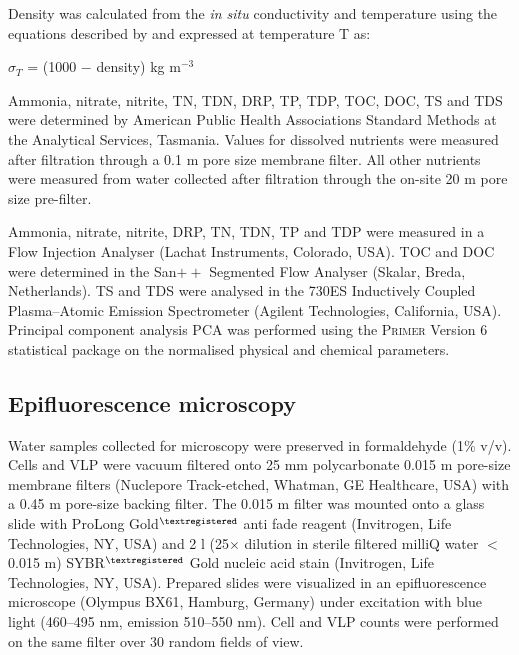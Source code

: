 Density was calculated from the \emph{in situ} conductivity and temperature using the equations described by \citet{Gibson1990} and expressed at temperature T as:

$\sigma_T$ = (1000 $-$ density) kg m$^{-3}$

Ammonia, nitrate, nitrite, \ac{TN}, \ac{TDN}, \ac{DRP}, \ac{TP}, \ac{TDP}, \ac{TOC}, \ac{DOC}, \ac{TS} and \ac{TDS} were determined by American Public Health Associations Standard Methods at the Analytical Services, Tasmania. 
Values for dissolved nutrients were measured after filtration through a 0.1 \textmu{}m pore size membrane filter. 
All other nutrients were measured from water collected after filtration through the on-site 20 \textmu{}m pore size pre-filter.
 
Ammonia, nitrate, nitrite, \ac{DRP}, \ac{TN}, \ac{TDN}, \ac{TP} and \ac{TDP} were measured in a Flow Injection Analyser (Lachat Instruments, Colorado, USA). 
\ac{TOC} and \ac{DOC} were determined in the San$++$ Segmented Flow Analyser (Skalar, Breda, Netherlands). 
\ac{TS} and \ac{TDS} were analysed in the 730ES Inductively Coupled Plasma--Atomic Emission Spectrometer (Agilent Technologies, California, USA). 
Principal component analysis \acs{PCA} was performed using the \textsc{Primer} Version 6 statistical package \cite{Clarke2006} on the normalised physical and chemical parameters.

\subsection{Epifluorescence microscopy}
Water samples collected for microscopy were preserved in formaldehyde (1\% v/v). 
Cells and \acs{VLP} were vacuum filtered onto 25 mm polycarbonate 0.015 \textmu{}m pore-size membrane filters (Nuclepore Track-etched, Whatman, GE Healthcare, USA) with a 0.45 \textmu{}m pore-size backing filter. 
The 0.015 \textmu{}m filter was mounted onto a glass slide with ProLong Gold$^{\textregistered}$ anti fade reagent (Invitrogen, Life Technologies, \textsc{NY}, \textsc{USA}) and 2 \textmu{}l (25$\times$ dilution in sterile filtered milliQ water $<$0.015 \textmu{}m) SYBR$^{\textregistered}$ Gold nucleic acid stain (Invitrogen, Life Technologies, \textsc{NY}, \textsc{USA}). 
Prepared slides were visualized in an epifluorescence microscope (Olympus BX61, Hamburg, Germany) under excitation with blue light (460--495 nm, emission 510--550 nm). 
Cell and \ac{VLP} counts were performed on the same filter over 30 random fields of view.

